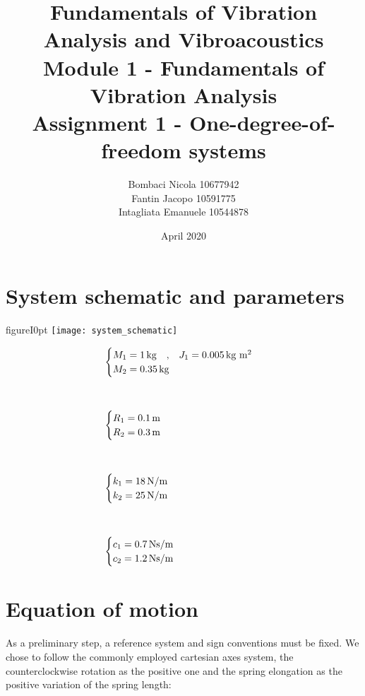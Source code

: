 \documentclass[a4paper,12pt,oneside]{article}
\title{Fundamentals of Vibration Analysis and Vibroacoustics \\
Module 1 - Fundamentals of Vibration Analysis \\
Assignment 1 - One-degree-of-freedom systems}
\author{Bombaci Nicola 10677942 \\
Fantin Jacopo 10591775 \\
Intagliata Emanuele 10544878}
\date{April 2020}
\begin{document}
\maketitle

\vspace{60pt}

\section*{System schematic and parameters}

\begin{wrapfloat}{figure}{I}{0pt}
	\texttt{[image: system\_schematic]}
\end{wrapfloat}

\[ \begin{split}
	& \begin{cases}
		M_1 = 1 \, \text{kg} \quad \text{,} \quad %
		J_1 = 0.005 \, \text{kg m $ \! \! ^2 $} \\
		M_2 = 0.35 \, \text{kg}
	\end{cases} \\[30pt]
	& \begin{cases}
		R_1 = 0.1 \, \text{m} \\
		R_2 = 0.3 \, \text{m}
	\end{cases} \\[30pt]
	& \begin{cases}
		k_1 = 18 \, \text{N/m} \\
		k_2 = 25 \, \text{N/m}
	\end{cases} \\[30pt]
	& \begin{cases}
		c_1 = 0.7 \, \text{Ns/m} \\
		c_2 = 1.2 \, \text{Ns/m}
	\end{cases}
\end{split} \]

\clearpage

\section{Equation of motion}

As a preliminary step, a reference system and sign conventions must be fixed. We chose to follow the commonly employed cartesian axes system, the counterclockwise rotation as the positive one and the spring elongation as the positive variation of the spring length:

\begin{figure}[H]
	\centering
	\hspace{50pt}
\end{figure}
\end{document}
